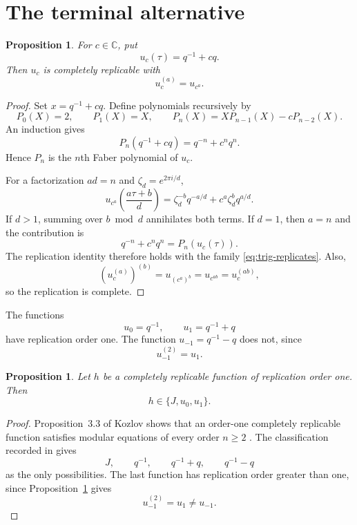 \documentclass[12pt]{amsart}
\newtheorem{prop}[thm]{Proposition}
\theoremstyle{definition}
\theoremstyle{remark}
\numberwithin{equation}{section}
\newcommand{\C}{\mathbb C}
\begin{document}
\section{The terminal alternative}

\begin{prop}\label{prop:trig-family}
For $c\in\C$, put
\[
u_c(\tau)=q^{-1}+cq.
\]
Then $u_c$ is completely replicable with
\begin{equation}\label{eq:trig-replicates}
u_c^{(a)}=u_{c^a}.
\end{equation}
\end{prop}

\begin{proof}
Set $x=q^{-1}+cq$. Define polynomials recursively by
\[
P_0(X)=2,
\qquad
P_1(X)=X,
\qquad
P_n(X)=XP_{n-1}(X)-cP_{n-2}(X).
\]
An induction gives
\[
P_n(q^{-1}+cq)=q^{-n}+c^nq^n.
\]
Hence $P_n$ is the $n$th Faber polynomial of $u_c$.

For a factorization $ad=n$ and $\zeta_d=e^{2\pi i/d}$,
\[
u_{c^a}\!\left(\frac{a\tau+b}{d}\right)
=
\zeta_d^{-b}q^{-a/d}+c^a\zeta_d^bq^{a/d}.
\]
If $d>1$, summing over $b\bmod d$ annihilates both terms. If $d=1$, then $a=n$ and the contribution is
\[
q^{-n}+c^nq^n=P_n(u_c(\tau)).
\]
The replication identity therefore holds with the family \eqref{eq:trig-replicates}. Also,
\[
\left(u_c^{(a)}\right)^{(b)}
=u_{(c^a)^b}
=u_{c^{ab}}
=u_c^{(ab)},
\]
so the replication is complete.
\end{proof}

The functions
\[
u_0=q^{-1},
\qquad
u_1=q^{-1}+q
\]
have replication order one. The function $u_{-1}=q^{-1}-q$ does not, since
\[
u_{-1}^{(2)}=u_1.
\]

\begin{prop}\label{prop:order-one-classification}
Let $h$ be a completely replicable function of replication order one. Then
\[
h\in\{J,u_0,u_1\}.
\]
\end{prop}

\begin{proof}
Proposition~3.3 of Kozlov shows that an order-one completely replicable function satisfies modular equations of every order $n\geq2$ \cite{kozlov}. The classification recorded in \cite[Theorem~2]{gannon-hauptmodul} gives
\[
J,\qquad q^{-1},\qquad q^{-1}+q,\qquad q^{-1}-q
\]
as the only possibilities. The last function has replication order greater than one, since Proposition~\ref{prop:trig-family} gives
\[
u_{-1}^{(2)}=u_1\neq u_{-1}.
\]
\end{proof}
\end{document}
